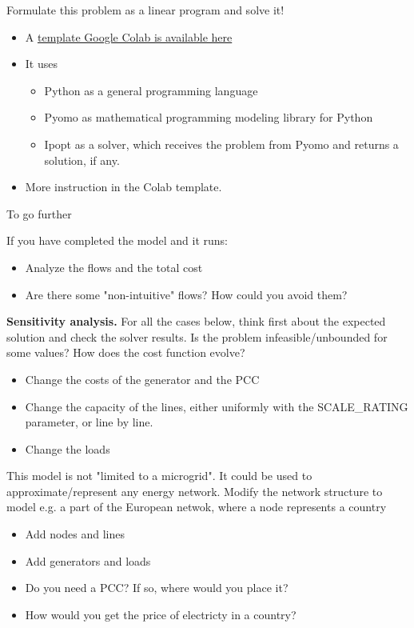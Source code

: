 \begin{frame}{Formulate this problem as a linear program and solve it!}

\begin{itemize}
    \item A \alert{\href{https://colab.research.google.com/drive/1lrWL7sOrazTzlapVxcxrv_ZvVUZADC0h?usp=sharing}{template Google Colab is available here}}
    \item It uses 
    \begin{itemize}
        \item Python as a general programming language
        \item Pyomo as mathematical programming modeling library for Python
        \item Ipopt as a solver, which receives the problem from Pyomo and returns a solution, if any.
    \end{itemize}
    \item More instruction in the Colab template.
\end{itemize}
\end{frame}

\begin{frame}[allowframebreaks]{To go further}

If you have completed the model and it runs: 
\begin{itemize}
	\item Analyze the flows and the total cost
	\item Are there some "non-intuitive" flows? How could you avoid them?
\end{itemize}

\textbf{Sensitivity analysis.} For all the cases below, think first about the expected solution and check the solver results. Is the problem infeasible/unbounded for some values? How does the cost function evolve? 
\begin{itemize}
	\item Change the costs of the generator and the PCC
	\item Change the capacity of the lines, either uniformly with the SCALE{\_}RATING parameter, or line by line. 
	\item Change the loads 
\end{itemize}

This model is not "limited to a microgrid". It could be used to approximate/represent any energy network. Modify the network structure to model e.g. a part of the European netwok, where a node represents a country
\begin{itemize}
	\item Add nodes and lines
	\item Add generators and loads
	\item Do you need a PCC? If so, where would you place it?
	\item How would you get the price of electricty in a country?
\end{itemize}
\end{frame}
